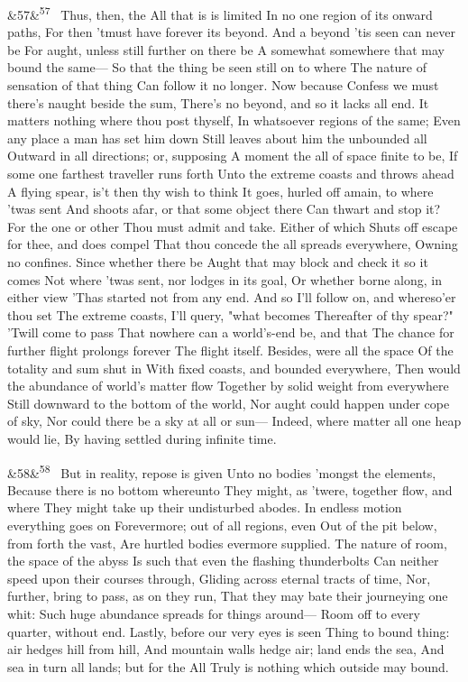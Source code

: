 \documentclass[12pt]{article}
\newcommand{\para}[1][]{\par\noindent\ifx&#1&\else\textsuperscript{\footnotesize #1}~\fi}
\begin{document}
\para[57] Thus, then, the All that is is limited In no one region of its onward paths, For then 'tmust have forever its beyond. And a beyond 'tis seen can never be For aught, unless still further on there be A somewhat somewhere that may bound the same--- So that the thing be seen still on to where The nature of sensation of that thing Can follow it no longer. Now because Confess we must there's naught beside the sum, There's no beyond, and so it lacks all end. It matters nothing where thou post thyself, In whatsoever regions of the same; Even any place a man has set him down Still leaves about him the unbounded all Outward in all directions; or, supposing A moment the all of space finite to be, If some one farthest traveller runs forth Unto the extreme coasts and throws ahead A flying spear, is't then thy wish to think It goes, hurled off amain, to where 'twas sent And shoots afar, or that some object there Can thwart and stop it? For the one or other Thou must admit and take. Either of which Shuts off escape for thee, and does compel That thou concede the all spreads everywhere, Owning no confines. Since whether there be Aught that may block and check it so it comes Not where 'twas sent, nor lodges in its goal, Or whether borne along, in either view 'Thas started not from any end. And so I'll follow on, and whereso'er thou set The extreme coasts, I'll query, "what becomes Thereafter of thy spear?" 'Twill come to pass That nowhere can a world's-end be, and that The chance for further flight prolongs forever The flight itself. Besides, were all the space Of the totality and sum shut in With fixed coasts, and bounded everywhere, Then would the abundance of world's matter flow Together by solid weight from everywhere Still downward to the bottom of the world, Nor aught could happen under cope of sky, Nor could there be a sky at all or sun--- Indeed, where matter all one heap would lie, By having settled during infinite time.

\para[58] But in reality, repose is given Unto no bodies 'mongst the elements, Because there is no bottom whereunto They might, as 'twere, together flow, and where They might take up their undisturbed abodes. In endless motion everything goes on Forevermore; out of all regions, even Out of the pit below, from forth the vast, Are hurtled bodies evermore supplied. The nature of room, the space of the abyss Is such that even the flashing thunderbolts Can neither speed upon their courses through, Gliding across eternal tracts of time, Nor, further, bring to pass, as on they run, That they may bate their journeying one whit: Such huge abundance spreads for things around--- Room off to every quarter, without end. Lastly, before our very eyes is seen Thing to bound thing: air hedges hill from hill, And mountain walls hedge air; land ends the sea, And sea in turn all lands; but for the All Truly is nothing which outside may bound.
\end{document}
